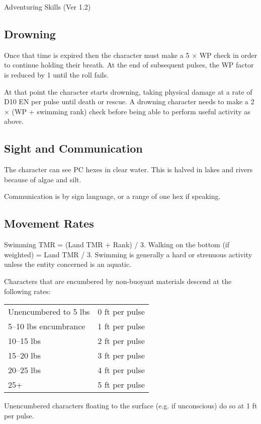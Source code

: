 \begin{Chapter}{Adventuring Skills (Ver 1.2)}
\subsection{Drowning}

Once that time is expired then the character must make a 5 × WP check
in order to continue holding their breath.  At the end of subsequent
pulses, the WP factor is reduced by 1 until the roll fails.

At that point the character starts drowning, taking physical damage at
a rate of D10 EN per pulse until death or rescue.  A drowning
character needs to make a 2 × (WP + swimming rank) check before being
able to perform useful activity as above.

\subsection{Sight and Communication}

The character can see PC hexes in clear water. This is halved in lakes
and rivers because of algae and silt.

Communication is by sign language, or a range of one hex if speaking.

\subsection{Movement Rates}

Swimming TMR = (Land TMR + Rank) / 3. Walking on the bottom (if
weighted) = Land TMR / 3.  Swimming is generally a hard or strenuous
activity unless the entity concerned is an aquatic.

Characters that are encumbered by non-buoyant materials descend at the
following rates:

\begin{tabularx}{\linewidth}{Xl} \\
Unencumbered to 5 lbs	& 0 ft per pulse \\
5–10 lbs encumbrance	& 1 ft per pulse \\
10–15 lbs		& 2 ft per pulse \\
15–20 lbs		& 3 ft per pulse \\
20–25 lbs		& 4 ft per pulse \\
25+			& 5 ft per pulse \\
\end{tabularx}

Unencumbered characters floating to the surface (e.g. if unconscious)
do so at 1 ft per pulse.

\end{Chapter}
